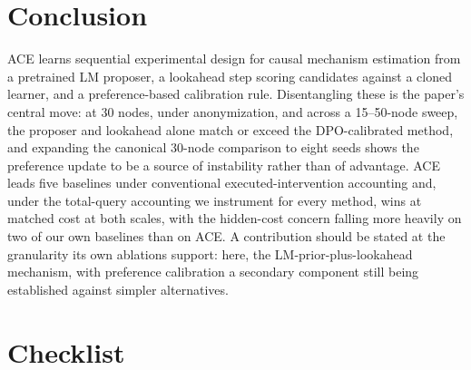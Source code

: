 \documentclass[twoside]{article}
\theoremstyle{plain}
\theoremstyle{definition}
\theoremstyle{remark}
\begin{document}
\section{Conclusion}
\label{sec:conclusion}

ACE learns sequential experimental design for causal mechanism estimation from a pretrained LM proposer, a lookahead step scoring candidates against a cloned learner, and a preference-based calibration rule. Disentangling these is the paper's central move: at 30 nodes, under anonymization, and across a 15--50-node sweep, the proposer and lookahead alone match or exceed the DPO-calibrated method, and expanding the canonical 30-node comparison to eight seeds shows the preference update to be a source of instability rather than of advantage. ACE leads five baselines under conventional executed-intervention accounting and, under the total-query accounting we instrument for every method, wins at matched cost at both scales, with the hidden-cost concern falling more heavily on two of our own baselines than on ACE. A contribution should be stated at the granularity its own ablations support: here, the LM-prior-plus-lookahead mechanism, with preference calibration a secondary component still being established against simpler alternatives.






\section*{Checklist}
\end{document}
